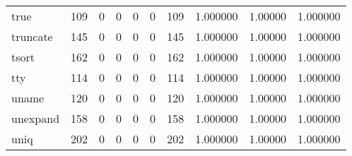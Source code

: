 \begin{tabular}{lrrrrrrrrr}
true      &                    109 &                                  0 &                                 0 &                                0 &                                 0 &                             109 &                                1.000000 &                                1.00000 &                             1.000000 \\
truncate  &                    145 &                                  0 &                                 0 &                                0 &                                 0 &                             145 &                                1.000000 &                                1.00000 &                             1.000000 \\
tsort     &                    162 &                                  0 &                                 0 &                                0 &                                 0 &                             162 &                                1.000000 &                                1.00000 &                             1.000000 \\
tty       &                    114 &                                  0 &                                 0 &                                0 &                                 0 &                             114 &                                1.000000 &                                1.00000 &                             1.000000 \\
uname     &                    120 &                                  0 &                                 0 &                                0 &                                 0 &                             120 &                                1.000000 &                                1.00000 &                             1.000000 \\
unexpand  &                    158 &                                  0 &                                 0 &                                0 &                                 0 &                             158 &                                1.000000 &                                1.00000 &                             1.000000 \\
uniq      &                    202 &                                  0 &                                 0 &                                0 &                                 0 &                             202 &                                1.000000 &                                1.00000 &                             1.000000 \\

\end{tabular}
